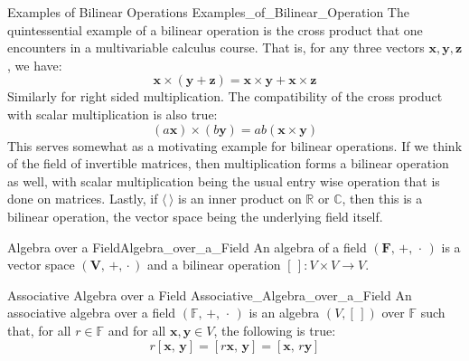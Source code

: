 \documentclass[crop=false,class=article]{standalone}                           %
\begin{document}
        \begin{lexample}{Examples of Bilinear Operations}
                        {Examples_of_Bilinear_Operation}
            The quintessential example of a bilinear operation is the
            cross product that one encounters in a multivariable calculus
            course. That is, for any three vectors
            $\mathbf{x},\mathbf{y},\mathbf{z}$, we have:
            \begin{equation}
                \mathbf{x}\times(\mathbf{y}+\mathbf{z})=
                \mathbf{x}\times\mathbf{y}+\mathbf{x}\times\mathbf{z}
            \end{equation}
            Similarly for right sided multiplication. The compatibility of
            the cross product with scalar multiplication is also true:
            \begin{equation}
                (a\mathbf{x})\times(b\mathbf{y})=ab(\mathbf{x}\times\mathbf{y})
            \end{equation}
            This serves somewhat as a motivating example for bilinear
            operations. If we think of the field of invertible matrices,
            then multiplication forms a bilinear operation as well, with
            scalar multiplication being the usual entry wise operation that
            is done on matrices. Lastly, if $\langle\,\rangle$ is an inner
            product on $\mathbb{R}$ or $\mathbb{C}$, then this is a bilinear
            operation, the vector space being the underlying field itself.
        \end{lexample}
        \begin{fdefinition}{Algebra over a Field}{Algebra_over_a_Field}
            An algebra of a field $(\mathbf{F},\,+,\,\cdot\,)$ is a
            vector space $(\mathbf{V},\,\boldsymbol{+},\,\boldsymbol{\cdot}\,)$
            and a bilinear operation $[\,]:V\times{V}\rightarrow{V}$.
        \end{fdefinition}
        \begin{fdefinition}{Associative Algebra over a Field}
                           {Associative_Algebra_over_a_Field}
            An associative algebra over a field $(\mathbb{F},\,+,\,\cdot\,)$
            is an algebra $(V,[\,])$ over $\mathbb{F}$ such that, for all
            $r\in\mathbb{F}$ and for all $\mathbf{x},\mathbf{y}\in{V}$,
            the following is true:
            \begin{equation}
                r[\mathbf{x},\,\mathbf{y}]=[r\mathbf{x},\,\mathbf{y}]
                                          =[\mathbf{x},\,r\mathbf{y}]
            \end{equation}
        \end{fdefinition}
\end{document}
